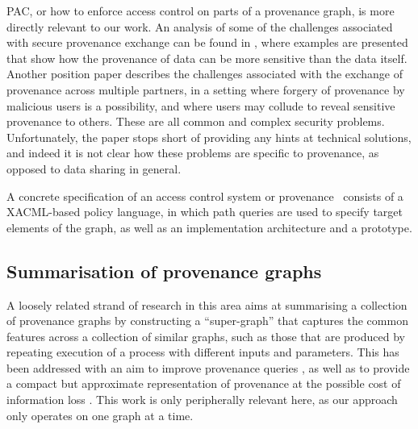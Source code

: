 PAC, or how to enforce access control on parts of a provenance graph, is more directly relevant to our work. An analysis of some of the  challenges associated with secure provenance exchange can be found in  \citep{Braun:2008:SP:1496671.1496675}, where 
examples are presented that show how the provenance of data can be more sensitive than the data itself.
%
Another position paper \citep{Hasan:2007:ISP:1314313.1314318}
describes the challenges associated with the exchange of provenance across multiple partners, in a setting where forgery of provenance by malicious users is a possibility, and where users may collude to reveal sensitive provenance to others. These are all common and complex security problems. Unfortunately, the paper stops short of providing any hints at technical solutions, and indeed it is not clear how these problems are specific to provenance, as opposed to data sharing in general.

A concrete specification of an access control system or provenance~\citep{Cadenhead:2011:LPA:1943513.1943532} consists of a XACML-based policy language, in which path queries are used to specify target elements of the graph, as well as an implementation architecture and a prototype.
%



\subsection{Summarisation of provenance graphs}

A loosely related strand of research in this area aims at summarising a collection of provenance graphs by constructing a ``super-graph'' that captures the common features across a collection of similar graphs, such as those that are produced by repeating execution of a process with different inputs and parameters. This has been addressed with an aim to improve provenance queries \citep{DBLP:journals/jidm/El-JaickML14}, as well as to provide a compact but approximate representation of provenance at the possible cost of information loss \citep{Ainy:2015:ASD:2806416.2806429}. This work is only peripherally relevant here, as our approach only operates on one graph at a time. 


